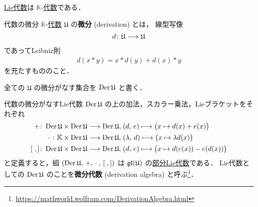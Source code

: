 \documentclass[rep_main]{subfiles}
\begin{document}
\hyperref[ax:LieAlg]{Lie代数}は $\mathbb{K}$-\hyperref[ax:Alg]{代数}である．

\begin{mydef}[label=def:derivation-Alg]{代数の微分}
    $\mathbb{K}$-\hyperref[ax:Alg]{代数} $\mathfrak{U}$ の\textbf{微分} (derivation) とは，
    線型写像
    \begin{align}
        d \colon \mathfrak{U} \longrightarrow \mathfrak{U}
    \end{align}
    であってLeibniz則
    \begin{align}
        d (x * y) = x * d (y) + d(x) * y
    \end{align}
    を充たすもののこと．
\end{mydef}

全ての $\mathfrak{U}$ の微分がなす集合を $\operatorname{Der} \mathfrak{U}$ と書く．

\begin{myprop}[label=prop:Der-LieAlg]{代数の微分がなすLie代数}
    $\operatorname{Der} \mathfrak{U}$ の上の加法，スカラー乗法，Lieブラケットをそれぞれ
    \begin{align}
        +\colon \Der \mathfrak{U} \times \Der \mathfrak{U} \lto \Der \mathfrak{U},\; &(d,\, e) \lmto \bigl( x \mapsto d(x) + e(x) \bigr) \\
        \cdot\;\colon \mathbb{K} \times \Der \mathfrak{U} \lto \Der \mathfrak{U},\; &(\lambda,\, d) \lmto \bigl( x \mapsto \lambda d(x) \bigr) \\
        \comm{\;}{\,}\colon \Der \mathfrak{U} \times \Der \mathfrak{U} \lto \Der \mathfrak{U},\; &(d,\, e) \lmto \bigl( x \mapsto d(e(x)) - e(d(x)) \bigr)
    \end{align}
    と定義すると，組 $(\Der \mathfrak{U},\, +,\, \cdot\;,\, \comm{\;}{\,})$ は $\mathfrak{gl} (\mathfrak{U})$ の\hyperref[def:subLieAlg]{部分Lie代数}である．
    Lie代数としての $\operatorname{Der} \mathfrak{U}$ のことを\textbf{微分代数} (derivation algebra) と呼ぶ\footnote{\url{https://mathworld.wolfram.com/DerivationAlgebra.html}}．
\end{myprop}
\end{document}
